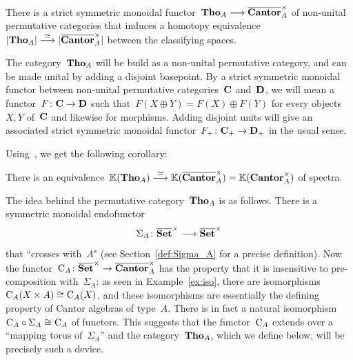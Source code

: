\begin{theorem}\label{back}
There is a strict symmetric monoidal functor~$\mathbf{Tho}_A \longrightarrow \overline{\mathbf{Cantor}}_A^\times$ of non-unital permutative categories that induces a homotopy equivalence~$|\mathbf{Tho}_A|\stackrel{\simeq}{\longrightarrow} |\overline{\mathbf{Cantor}}_A^\times|$ between the classifying spaces. 
\end{theorem}

The category~$\mathbf{Tho}_A$ will be build as a non-unital permutative category, and can be made unital by adding a disjoint basepoint. By a strict symmetric monoidal functor between non-unital permutative categories~$\mathbf{C}$ and~${\bf D}$, we will mean a functor~$F\colon\mathbf{C}\to {\bf D}$ such that~$F(X\oplus Y)=F(X)\oplus F(Y)$ for every objects~$X,Y$ of~$\mathbf{C}$ and likewise for morphisms. Adding disjoint units will give an associated strict symmetric monoidal functor~$F_+\colon\mathbf{C}_+\to {\bf D}_+$ in the usual sense. 

Using~\cite[Lem.~2.3]{Thomason}, we get the following corollary: 

\begin{corollary}\label{cor:KCan=KTho}
There is an equivalence~$\mathbb{K}(\mathbf{Tho}_A) \stackrel{\simeq}{\longrightarrow} \mathbb{K}(\overline{\mathbf{Cantor}}_A^\times)=\mathbb{K}(\mathbf{Cantor}_A^\times)$ of spectra.
\end{corollary}

The idea behind the permutative category~$\mathbf{Tho}_A$ is as follows. 
There is a symmetric monoidal endofunctor
\[
\Sigma_A\colon\overline{\mathbf{Set}}^\times\longrightarrow\overline{\mathbf{Set}}^\times
\]
that ``crosses with~$A$" (see Section~\ref{def:Sigma_A} for a precise definition). %
Now the functor~$\mathrm{C}_A\colon\overline{\mathbf{Set}}^\times\to \overline{\mathbf{Cantor}}_A^\times$ has the property that it is insensitive to pre-composition with~$\Sigma_A$: as seen in Example~\ref{ex:iso}, there are isomorphisms~\hbox{$\mathrm{C}_A(X\times A)\cong\mathrm{C}_A(X)$}, and these isomorphisms are essentially the defining property of Cantor algebras of type~$A$. There is in fact a natural isomorphism~\hbox{$\mathrm{C}_A\circ\Sigma_A\cong\mathrm{C}_A$} of functors. This suggests that the functor~$\mathrm{C}_A$ extends over a ``mapping torus of~$\Sigma_A$'' and the category~$\mathbf{Tho}_A$, which we define below, will be precisely such a device. 

